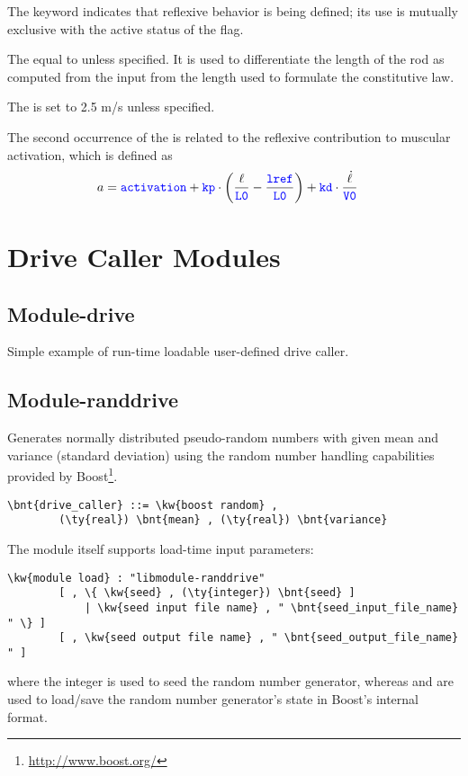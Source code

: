 The  keyword indicates that reflexive behavior is being defined;
its use is mutually exclusive with the active status of the  flag.

The  equal to  unless specified.
It is used to differentiate the length of the rod as computed from the input
from the length used to formulate the constitutive law.

The  is set to 2.5 m/s unless specified.

The second occurrence of the  is related
to the reflexive contribution to muscular activation, which is defined as
\begin{align}
	a
	&=
	\textcolor{blue}{\texttt{activation}}
	+
	\textcolor{blue}{\texttt{kp}} \cdot \left( 
		\frac{\ell}{\textcolor{blue}{\texttt{L0}}}
		-
		\frac{\textcolor{blue}{\texttt{lref}}}{\textcolor{blue}{\texttt{L0}}}
	 \right)
	+
	\textcolor{blue}{\texttt{kd}} \cdot \frac{\dot{\ell}}{\textcolor{blue}{\texttt{V0}}}
\end{align}



\section{Drive Caller Modules}

\subsection{Module-drive}
Simple example of run-time loadable user-defined drive caller.


\subsection{Module-randdrive}
Generates normally distributed pseudo-random numbers
with given mean and variance (standard deviation) using 
the random number handling capabilities
provided by Boost\footnote{\url{http://www.boost.org/}}.
\begin{Verbatim}[commandchars=\\\{\}]
    \bnt{drive_caller} ::= \kw{boost random} ,
        (\ty{real}) \bnt{mean} , (\ty{real}) \bnt{variance}
\end{Verbatim}
The module itself supports load-time input parameters:
\begin{Verbatim}[commandchars=\\\{\}]
    \kw{module load} : "libmodule-randdrive"
        [ , \{ \kw{seed} , (\ty{integer}) \bnt{seed} ]
            | \kw{seed input file name} , " \bnt{seed_input_file_name} " \} ]
        [ , \kw{seed output file name} , " \bnt{seed_output_file_name} " ]
\end{Verbatim}
where the integer  is used to seed the random number generator,
whereas  and 
are used to load/save the random number generator's state
in Boost's internal format.



